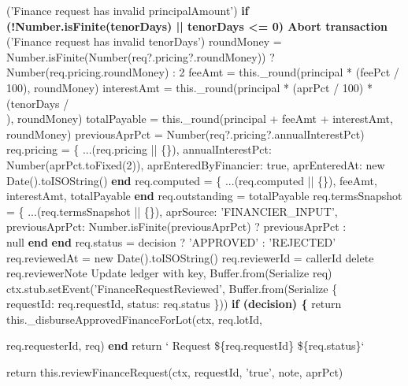 \documentclass[12pt]{article}
\begin{document}
\begin{algorithm}[H]
\caption{reviewFinanceRequest() (Part 2 of 3)}
\quad ('Finance request has invalid principalAmount')\;
\textbf{if (!Number.isFinite(tenorDays) || tenorDays <= 0) Abort transaction}\\
\quad ('Finance request has invalid tenorDays')\;
roundMoney = Number.isFinite(Number(req?.pricing?.roundMoney)) ?\\
\quad Number(req.pricing.roundMoney) : 2\;
feeAmt = this.\_round(principal * (feePct / 100), roundMoney)\;
interestAmt = this.\_round(principal * (aprPct / 100) * (tenorDays /\\
), roundMoney)\;
totalPayable = this.\_round(principal + feeAmt + interestAmt,\\
\quad roundMoney)\;
previousAprPct = Number(req?.pricing?.annualInterestPct)\;
req.pricing = \{\;
...(req.pricing || \{\}),\;
annualInterestPct: Number(aprPct.toFixed(2)),\;
aprEnteredByFinancier: true,\;
aprEnteredAt: new Date().toISOString()\;
\textbf{end}\;
req.computed = \{\;
...(req.computed || \{\}),\;
feeAmt,\;
interestAmt,\;
totalPayable\;
\textbf{end}\;
req.outstanding = totalPayable\;
req.termsSnapshot = \{\;
...(req.termsSnapshot || \{\}),\;
aprSource: 'FINANCIER\_INPUT',\;
previousAprPct: Number.isFinite(previousAprPct) ? previousAprPct :\\
\quad null\;
\textbf{end}\;
\textbf{end}\;
req.status = decision ? 'APPROVED' : 'REJECTED'\;
req.reviewedAt = new Date().toISOString()\;
req.reviewerId = callerId\;
delete req.reviewerNote\;
Update ledger with key, Buffer.from(Serialize req)\;
ctx.stub.setEvent('FinanceRequestReviewed', Buffer.from(Serialize \{\\
\quad requestId: req.requestId, status: req.status \}))\;
\textbf{if (decision) \{}\;
return this.\_disburseApprovedFinanceForLot(ctx, req.lotId,\\
\end{algorithm}


\begin{algorithm}[H]
\caption{reviewFinanceRequest() (Part 3 of 3)}
\quad req.requesterId, req)\;
\textbf{end}\;
return ` Request \$\{req.requestId\} \$\{req.status\}`\;
\end{algorithm}


\begin{algorithm}[H]
\caption{approveFinanceRequestWithAPR()}
return this.reviewFinanceRequest(ctx, requestId, 'true', note, aprPct)\;
\end{algorithm}
\end{document}
